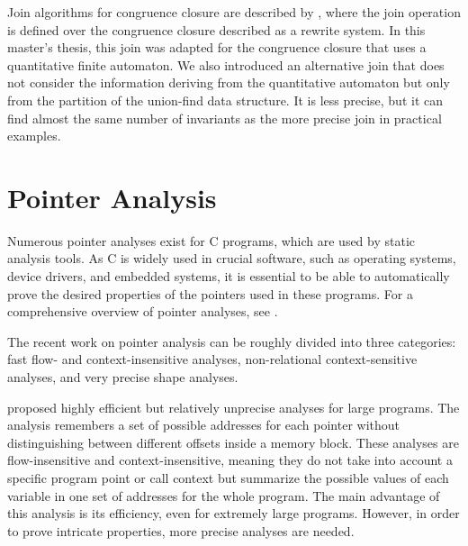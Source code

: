 Join algorithms for congruence closure are described by \textcite{join}, where the join operation is defined over the congruence closure described as a rewrite system.
In this master's thesis, this join was adapted for the congruence closure that uses a quantitative finite automaton.
We also introduced an alternative join that does not consider the information deriving from the quantitative automaton but only from the partition of the union-find data structure.
It is less precise, but it can find almost the same number of invariants as the more precise join in practical examples.

\section{Pointer Analysis}

Numerous pointer analyses exist for C programs, which are used by static analysis tools.
As C is widely used in crucial software, such as operating systems, device drivers, and embedded systems, it is essential to be able to automatically prove the desired properties of the pointers used in these programs.
For a comprehensive overview of pointer analyses, see \textcite{pointeranalysis}.

The recent work on pointer analysis can be roughly divided into three categories: fast flow- and context-insensitive analyses, non-relational context-sensitive analyses, and very precise shape analyses.

\textcite{Andersen,Steensgaard} proposed highly efficient but relatively unprecise analyses for large programs.
The analysis remembers a set of possible addresses for each pointer without distinguishing between different offsets inside a memory block.
These analyses are flow-insensitive and context-insensitive, meaning they do not take into account a specific program point or call context but summarize the possible values of each variable in one set of addresses for the whole program.
The main advantage of this analysis is its efficiency, even for extremely large programs.
However, in order to prove intricate properties, more precise analyses are needed.

